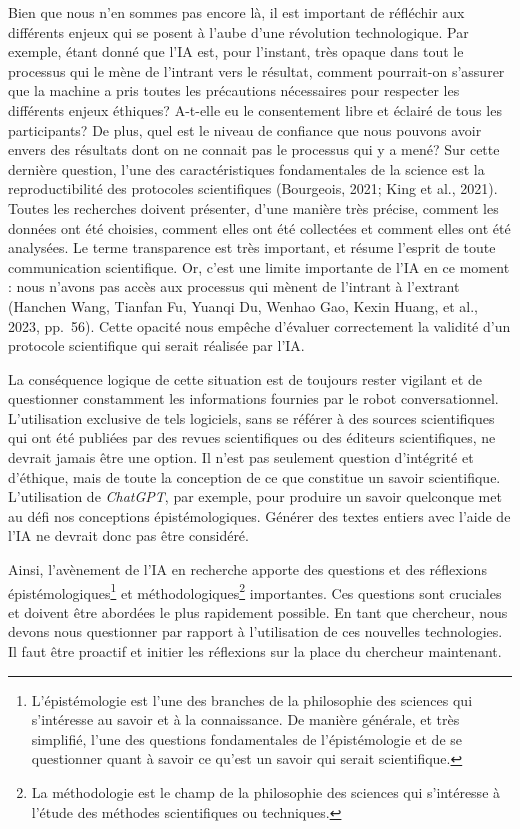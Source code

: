 \documentclass[
  letterpaper,
  DIV=11,
  numbers=noendperiod,
  oneside]{scrreprt}
\begin{document}
Bien que nous n'en sommes pas encore là, il est important de réfléchir
aux différents enjeux qui se posent à l'aube d'une révolution
technologique. Par exemple, étant donné que l'IA est, pour l'instant,
très opaque dans tout le processus qui le mène de l'intrant vers le
résultat, comment pourrait-on s'assurer que la machine a pris toutes les
précautions nécessaires pour respecter les différents enjeux éthiques?
A-t-elle eu le consentement libre et éclairé de tous les participants?
De plus, quel est le niveau de confiance que nous pouvons avoir envers
des résultats dont on ne connait pas le processus qui y a mené? Sur
cette dernière question, l'une des caractéristiques fondamentales de la
science est la reproductibilité des protocoles scientifiques (Bourgeois,
2021; King et al., 2021). Toutes les recherches doivent présenter, d'une
manière très précise, comment les données ont été choisies, comment
elles ont été collectées et comment elles ont été analysées. Le terme
transparence est très important, et résume l'esprit de toute
communication scientifique. Or, c'est une limite importante de l'IA en
ce moment : nous n'avons pas accès aux processus qui mènent de l'intrant
à l'extrant (Hanchen Wang, Tianfan Fu, Yuanqi Du, Wenhao Gao, Kexin
Huang, et al., 2023, pp.~56). Cette opacité nous empêche d'évaluer
correctement la validité d'un protocole scientifique qui serait réalisée
par l'IA.

La conséquence logique de cette situation est de toujours rester
vigilant et de questionner constamment les informations fournies par le
robot conversationnel. L'utilisation exclusive de tels logiciels, sans
se référer à des sources scientifiques qui ont été publiées par des
revues scientifiques ou des éditeurs scientifiques, ne devrait jamais
être une option. Il n'est pas seulement question d'intégrité et
d'éthique, mais de toute la conception de ce que constitue un savoir
scientifique. L'utilisation de \emph{ChatGPT}, par exemple, pour
produire un savoir quelconque met au défi nos conceptions
épistémologiques. Générer des textes entiers avec l'aide de l'IA ne
devrait donc pas être considéré.

Ainsi, l'avènement de l'IA en recherche apporte des questions et des
réflexions épistémologiques\footnote{L'épistémologie est l'une des
  branches de la philosophie des sciences qui s'intéresse au savoir et à
  la connaissance. De manière générale, et très simplifié, l'une des
  questions fondamentales de l'épistémologie et de se questionner quant
  à savoir ce qu'est un savoir qui serait scientifique.} et
méthodologiques\footnote{La méthodologie est le champ de la philosophie
  des sciences qui s'intéresse à l'étude des méthodes scientifiques ou
  techniques.} importantes. Ces questions sont cruciales et doivent être
abordées le plus rapidement possible. En tant que chercheur, nous devons
nous questionner par rapport à l'utilisation de ces nouvelles
technologies. Il faut être proactif et initier les réflexions sur la
place du chercheur maintenant.
\end{document}
